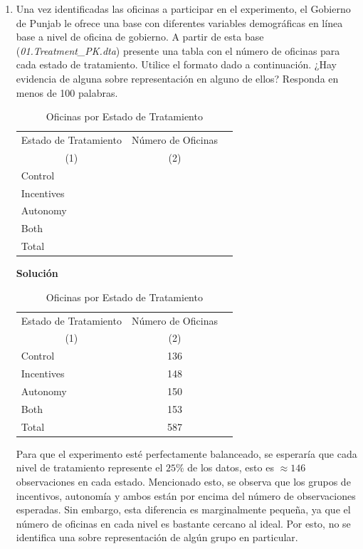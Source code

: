 \documentclass[a4paper, answers, addpoints, 11pt]{exam}
\newenvironment{solucion}{%
  \begin{mdframed}[
    backgroundcolor=blue!5,    %
    linecolor=blue!50,          %
    linewidth=2pt,              %
    leftmargin=10pt,            %
    rightmargin=8pt,           %
    topline=true,              %
    bottomline=true,            %
    roundcorner=10pt,           %
    innerleftmargin=10pt,       %
    innerrightmargin=10pt,      %
    innerbottommargin=10pt,     %
    innertopmargin=10pt         %
  ]%
  \begin{tcolorbox}[colframe=blue!50!black, colback=blue!50, coltitle=white, sharp corners=all, boxrule=1mm, width=\textwidth, halign=left, valign=center, top=0mm, bottom=0mm, left=0mm, right=0mm] \textbf{Solución} \end{tcolorbox} }{\end{mdframed}}
\begin{document}
\begin{enumerate}
    \item Una vez identificadas las oficinas a participar en el experimento, el Gobierno de Punjab le ofrece una base con diferentes variables demográficas en línea base a nivel de oficina de gobierno. A partir de esta base (\textit{01.Treatment\_PK.dta}) presente una tabla con el número de oficinas para cada estado de tratamiento. Utilice el formato dado a continuación. ¿Hay evidencia de alguna sobre representación en alguno de ellos? Responda en menos de 100 palabras.
    \begin{table}[H]
		\centering
			\caption{Oficinas por Estado de Tratamiento}
			\label{tab1:equivalence}
			\begin{tabular}{lcc}
				\toprule
				\multicolumn{1}{c}{Estado de Tratamiento} & \multicolumn{1}{c}{Número de Oficinas}  \\
				\multicolumn{1}{c}{(1)} & 	\multicolumn{1}{c}{(2)} \\ \toprule
				  \addlinespace 
				Control & \\
                Incentives & \\
                Autonomy & \\
                Both & \\ \midrule
                Total & \\ \bottomrule
			\end{tabular}	
	\end{table}
\begin{solucion}
 \begin{table}[H]
		\centering
			\caption{Oficinas por Estado de Tratamiento}
			\label{tab1:equivalence}
			\begin{tabular}{lcc}
				\toprule
				\multicolumn{1}{c}{Estado de Tratamiento} & \multicolumn{1}{c}{Número de Oficinas}  \\
				\multicolumn{1}{c}{(1)} & 	\multicolumn{1}{c}{(2)} \\ \toprule
				  \addlinespace 
				Control & 136\\
                Incentives & 148 \\
                Autonomy & 150\\
                Both & 153\\ \midrule
                Total &  587\\ \bottomrule
			\end{tabular}	
	\end{table}

    Para que el experimento esté perfectamente balanceado, se esperaría que cada nivel de tratamiento represente el $25\%$ de los datos, esto es $\approx 146$ observaciones en cada estado. Mencionado esto, se observa que los grupos de incentivos, autonomía y ambos están por encima del número de observaciones esperadas. Sin embargo, esta diferencia es marginalmente pequeña, ya que el número de oficinas en cada nivel es bastante cercano al ideal. Por esto, no se identifica una sobre representación de algún grupo en particular.
    

\end{solucion}
\end{enumerate}
\end{document}
